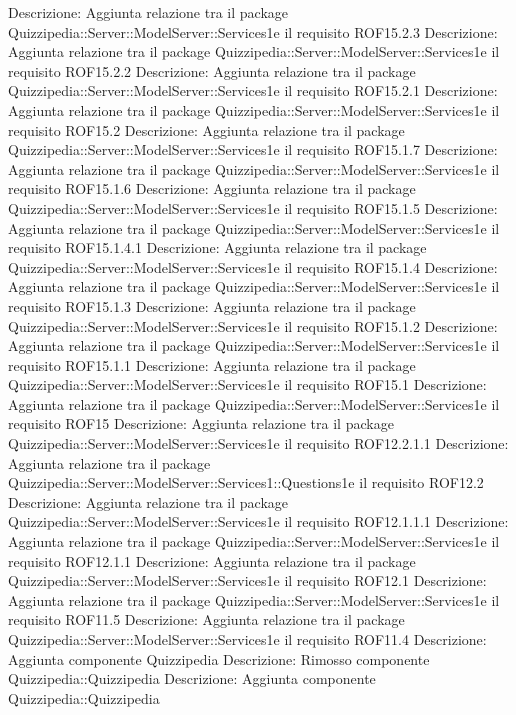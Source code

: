 Descrizione: Aggiunta relazione tra il package Quizzipedia::Server::ModelServer::Services1e il requisito ROF15.2.3 
Descrizione: Aggiunta relazione tra il package Quizzipedia::Server::ModelServer::Services1e il requisito ROF15.2.2 
Descrizione: Aggiunta relazione tra il package Quizzipedia::Server::ModelServer::Services1e il requisito ROF15.2.1 
Descrizione: Aggiunta relazione tra il package Quizzipedia::Server::ModelServer::Services1e il requisito ROF15.2 
Descrizione: Aggiunta relazione tra il package Quizzipedia::Server::ModelServer::Services1e il requisito ROF15.1.7 
Descrizione: Aggiunta relazione tra il package Quizzipedia::Server::ModelServer::Services1e il requisito ROF15.1.6 
Descrizione: Aggiunta relazione tra il package Quizzipedia::Server::ModelServer::Services1e il requisito ROF15.1.5 
Descrizione: Aggiunta relazione tra il package Quizzipedia::Server::ModelServer::Services1e il requisito ROF15.1.4.1 
Descrizione: Aggiunta relazione tra il package Quizzipedia::Server::ModelServer::Services1e il requisito ROF15.1.4 
Descrizione: Aggiunta relazione tra il package Quizzipedia::Server::ModelServer::Services1e il requisito ROF15.1.3 
Descrizione: Aggiunta relazione tra il package Quizzipedia::Server::ModelServer::Services1e il requisito ROF15.1.2 
Descrizione: Aggiunta relazione tra il package Quizzipedia::Server::ModelServer::Services1e il requisito ROF15.1.1 
Descrizione: Aggiunta relazione tra il package Quizzipedia::Server::ModelServer::Services1e il requisito ROF15.1 
Descrizione: Aggiunta relazione tra il package Quizzipedia::Server::ModelServer::Services1e il requisito ROF15 
Descrizione: Aggiunta relazione tra il package Quizzipedia::Server::ModelServer::Services1e il requisito ROF12.2.1.1 
Descrizione: Aggiunta relazione tra il package Quizzipedia::Server::ModelServer::Services1::Questions1e il requisito ROF12.2 
Descrizione: Aggiunta relazione tra il package Quizzipedia::Server::ModelServer::Services1e il requisito ROF12.1.1.1 
Descrizione: Aggiunta relazione tra il package Quizzipedia::Server::ModelServer::Services1e il requisito ROF12.1.1 
Descrizione: Aggiunta relazione tra il package Quizzipedia::Server::ModelServer::Services1e il requisito ROF12.1 
Descrizione: Aggiunta relazione tra il package Quizzipedia::Server::ModelServer::Services1e il requisito ROF11.5 
Descrizione: Aggiunta relazione tra il package Quizzipedia::Server::ModelServer::Services1e il requisito ROF11.4 
Descrizione: Aggiunta componente Quizzipedia 
Descrizione: Rimosso componente Quizzipedia::Quizzipedia 
Descrizione: Aggiunta componente Quizzipedia::Quizzipedia 
